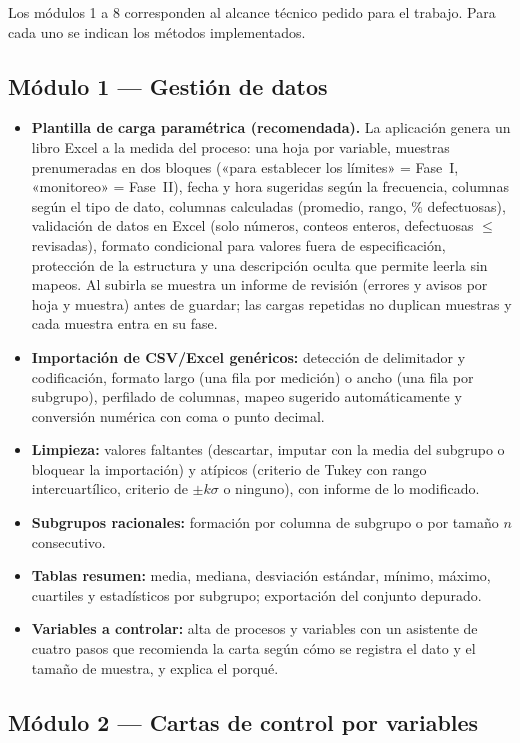 \documentclass[11pt,a4paper]{article}
\begin{document}
Los módulos 1 a 8 corresponden al alcance técnico pedido para el trabajo. Para cada uno se
indican los métodos implementados.

\subsection{Módulo 1 — Gestión de datos}
\begin{itemize}
\item \textbf{Plantilla de carga paramétrica (recomendada).} La aplicación genera un libro Excel
  a la medida del proceso: una hoja por variable, muestras prenumeradas en dos bloques («para
  establecer los límites» = Fase~I, «monitoreo» = Fase~II), fecha y hora sugeridas según la
  frecuencia, columnas según el tipo de dato, columnas calculadas (promedio, rango,
  \% defectuosas), validación de datos en Excel (solo números, conteos enteros, defectuosas
  $\le$ revisadas), formato condicional para valores fuera de especificación, protección de la
  estructura y una descripción oculta que permite leerla sin mapeos. Al subirla se muestra un
  informe de revisión (errores y avisos por hoja y muestra) antes de guardar; las cargas
  repetidas no duplican muestras y cada muestra entra en su fase.
\item \textbf{Importación de CSV/Excel genéricos:} detección de delimitador y codificación,
  formato largo (una fila por medición) o ancho (una fila por subgrupo), perfilado de columnas,
  mapeo sugerido automáticamente y conversión numérica con coma o punto decimal.
\item \textbf{Limpieza:} valores faltantes (descartar, imputar con la media del subgrupo o
  bloquear la importación) y atípicos (criterio de Tukey con rango intercuartílico, criterio de
  $\pm k\sigma$ o ninguno), con informe de lo modificado.
\item \textbf{Subgrupos racionales:} formación por columna de subgrupo o por tamaño $n$
  consecutivo.
\item \textbf{Tablas resumen:} media, mediana, desviación estándar, mínimo, máximo, cuartiles y
  estadísticos por subgrupo; exportación del conjunto depurado.
\item \textbf{Variables a controlar:} alta de procesos y variables con un asistente de cuatro
  pasos que recomienda la carta según cómo se registra el dato y el tamaño de muestra, y explica
  el porqué.
\end{itemize}

\subsection{Módulo 2 — Cartas de control por variables}
\end{document}
